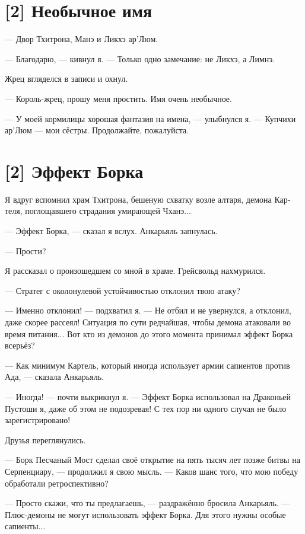 \documentclass[a4paper,12pt,fleqn]{book}\usepackage{cooltooltips}\usepackage{polyglossia}\setdefaultlanguage[babelshorthands=true]{russian}\setotherlanguage{english}\defaultfontfeatures{Ligatures=TeX,Mapping=tex-text} \usepackage{xcolor}\definecolor{lightgray}{HTML}{bbbbbb}\color{lightgray}\newcommand{\ml}[3]{\textenglish{\textcolor{black}{#3}}}
\begin{document}
{\section{[2] Необычное имя}

--- Двор Тхитрона, Манэ и Ликхэ ар'Люм.

--- Благодарю, --- кивнул я.
--- Только одно замечание: не Ликхэ, а Лимнэ.

Жрец вгляделся в записи и охнул.

--- Король-жрец, прошу меня простить.
Имя очень необычное.

--- У моей кормилицы хорошая фантазия на имена, --- улыбнулся я.
--- Купчихи ар'Люм --- мои сёстры.
Продолжайте, пожалуйста.

\section{[2] Эффект Борка}

Я вдруг вспомнил храм Тхитрона, бешеную схватку возле алтаря, демона Картеля, поглощавшего страдания умирающей Чханэ...

--- Эффект Борка, --- сказал я вслух.
Анкарьяль запнулась.

--- Прости?

Я рассказал о произошедшем со мной в храме.
Грейсвольд нахмурился.

--- Стратег с околонулевой устойчивостью отклонил твою атаку?

--- Именно отклонил! --- подхватил я.
--- Не отбил и не увернулся, а отклонил, даже скорее рассеял!
Ситуация по сути редчайшая, чтобы демона атаковали во время питания...
Вот кто из демонов до этого момента принимал эффект Борка всерьёз?

--- Как минимум Картель, который иногда использует армии сапиентов против Ада, --- сказала Анкарьяль.

--- Иногда! --- почти выкрикнул я.
--- Эффект Борка использовал на Драконьей Пустоши я, даже об этом не подозревая!
С тех пор ни одного случая не было зарегистрировано!

Друзья переглянулись.

--- Борк Песчаный Мост сделал своё открытие на пять тысяч лет позже битвы на Серпенциару, --- продолжил я свою мысль.
--- Каков шанс того, что мою победу обработали ретроспективно?

--- Просто скажи, что ты предлагаешь, --- раздражённо бросила Анкарьяль.
--- Плюс-демоны не могут использовать эффект Борка.
Для этого нужны особые сапиенты...

}
\end{document}
